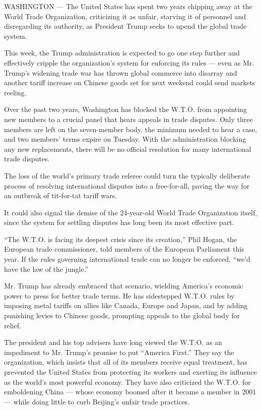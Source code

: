 WASHINGTON --- The United States has spent two years chipping away at
the World Trade Organization, criticizing it as unfair, starving it of
personnel and disregarding its authority, as President Trump seeks to
upend the global trade system.

This week, the Trump administration is expected to go one step further
and effectively cripple the organization's system for enforcing its
rules --- even as Mr. Trump's widening trade war has thrown global
commerce into disarray and another tariff increase on Chinese goods set
for next weekend could send markets reeling.

Over the past two years, Washington has blocked the W.T.O. from
appointing new members to a crucial panel that hears appeals in trade
disputes. Only three members are left on the seven-member body, the
minimum needed to hear a case, and two members' terms expire on Tuesday.
With the administration blocking any new replacements, there will be no
official resolution for many international trade disputes.

The loss of the world's primary trade referee could turn the typically
deliberate process of resolving international disputes into a
free-for-all, paving the way for an outbreak of tit-for-tat tariff wars.

It could also signal the demise of the 24-year-old World Trade
Organization itself, since the system for settling disputes has long
been its most effective part.

``The W.T.O. is facing its deepest crisis since its creation,'' Phil
Hogan, the European trade commissioner, told members of the European
Parliament this year. If the rules governing international trade can no
longer be enforced, ``we'd have the law of the jungle.''

Mr. Trump has already embraced that scenario, wielding America's
economic power to press for better trade terms. He has sidestepped
W.T.O. rules by imposing metal tariffs on allies like Canada, Europe and
Japan, and by adding punishing levies to Chinese goods, prompting
appeals to the global body for relief.

The president and his top advisers have long viewed the W.T.O. as an
impediment to Mr. Trump's promise to put ``America First.'' They say the
organization, which insists that all of its members receive equal
treatment, has prevented the United States from protecting its workers
and exerting its influence as the world's most powerful economy. They
have also criticized the W.T.O. for emboldening China --- whose economy
boomed after it became a member in 2001 --- while doing little to curb
Beijing's unfair trade practices.

